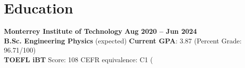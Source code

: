 \documentclass[a4paper,11pt,notitlepage]{article}
\begin{document}
\bigskip

\section{Education}

\begin{minipage}[t][][t]{\textwidth}
{\bf\large Monterrey Institute of Technology} \hfill {\bf Aug 2020 -- Jun 2024}\\[0.3em]
{\large \bf B.Sc. Engineering Physics} (expected) \hfill 
{\bf Current GPA}: 3.87 (Percent Grade: 96.71/100) \\[0.3em]
\textbf{TOEFL iBT} Score: 108 \hfill CEFR equivalence: C1
(%

\end{minipage}%
\bigskip

\medskip

\bigskip

\medskip

\medskip

\medskip
\end{document}
